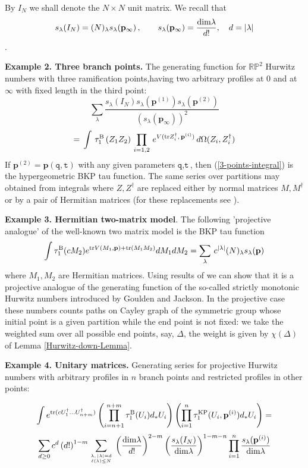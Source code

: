 \documentclass[a4paper,10pt]{article}
\newcommand{\bpow}{\mathbf{p}}
\theoremstyle{plain}
\theoremstyle{remark}
\def\tr{\mathrm {tr}}
\def\be{\begin{equation}}
\def\ee{\end{equation}}
\def\tr{\mathrm {tr}}
\begin{document}
By $I_N$ we shall denote the $N\times N$ unit matrix.
We  recall that
$$ s_\lambda(I_N)=(N)_\lambda s_\lambda(\bpow_\infty)\,,
\qquad s_\lambda(\bpow_\infty) = \frac{{\rm dim}\lambda}{d!},\quad d=|\lambda|$$.


{\bf Example 2. Three branch points.}
The generating function for $\mathbb{RP}^2$ Hurwitz numbers with three ramification points,having two
arbitrary profiles at $0$ and at $\infty$ with fixed length in the third point:
\be\label{3-points-integral}
 \sum_{\lambda}\frac{s_\lambda(I_N)s_\lambda(\bpow^{(1)})s_\lambda(\bpow^{(2)})}{\left( s_\lambda(\bpow_\infty) \right)^2}
\ee
\[
 = \,\int \,\tau^{\rm B}_1\left( Z_1 Z_2 \right)  \,\prod_{i=1,2} \,
  e^{V(\tr Z^\dag_i,\,\bpow^{(i)})}\,d\Omega(Z_i,Z^\dag_i)
\]
If $\bpow^{(2)}=\bpow(\texttt{q},\texttt{t})$ with any given parameters $\texttt{q},\texttt{t}$,
then (\ref{3-points-integral}) is the hypergeometric BKP tau function. The same series over partitions may obtained
from integrals where $Z,Z^\dag$ are replaced either by normal matrices $M,M^\dag$ or by a pair of Hermitian matrices
(for these replacements see \cite{NO-2014}).

{\bf Example 3. Hermitian two-matrix model}.
The following
'projective analogue' of the well-known two matrix model is the BKP tau function
\[
\int \tau^{\rm B}_1(c M_2)  e^{\tr V(M_1,\bpow)+\tr (M_1 M_2)}dM_1dM_2 =
\sum_{\lambda}\,c^{|\lambda|} (N)_\lambda  s_\lambda(\bpow)
\]
where $M_1,M_2$ are Hermitian matrices.
Using results of \cite{GJ} we can show that it is a projective analogue of the generating function of the
so-called strictly monotonic Hurwitz numbers introduced by Goulden and Jackson. In the
projective case these numbers counts paths on Cayley graph of the symmetric group whose initial point is a given partition
while the end point is not fixed: we take the weighted sum over all possible end points, say, $\Delta$,  the weight is
given by $\chi(\Delta)$ of Lemma \ref{Hurwitz-down-Lemma}.

{\bf Example 4. Unitary matrices.} Generating series for projective Hurwitz numbers with arbitrary profiles
in $n$ branch points and restricted profiles in other points:



\be\label{multimatrix-unitary-RP2'}
\int e^{\tr (c U_1^\dag \dots U_{n+m}^\dag)}
\left(\prod_{i=n+1}^{n+m} \tau^{\rm B}_1(U_i) d_*U_i \right)
\left(\prod_{i=1}^{n} \tau^{\rm KP}_1(U_i,\bpow^{(i)}) d_*U_i \right)
=
\ee
\[
\sum_{d\ge 0}c^d \left( d! \right)^{1-m} \sum_{\lambda,\, |\lambda|=
d\atop \ell(\lambda)\le N}\, \left(\frac{{\rm dim}\lambda}{d!}  \right)^{2-m}
\left(\frac{s_\lambda(I_N)}{{\rm dim} \lambda} \right)^{1-m-n}
\prod_{i=1}^n \frac{s_\lambda(\bpow^{(i)})}{{\rm dim} \lambda}
\]
\end{document}
